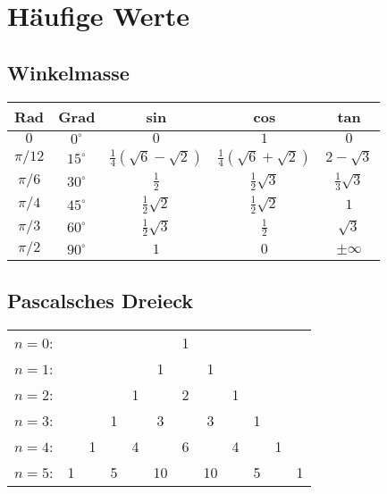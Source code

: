 \section{Häufige Werte}
\subsection{Winkelmasse}
\begin{center}
\begin{tabular}{c|c|c|c|c}
\textbf{Rad}& \textbf{Grad} & \textbf{sin} 						& \textbf{cos} 						& \textbf{tan} \\\hline
$0$ 		& $0^\circ$ 	& $0$ 								& $1$ 								& $0$\\
$\pi/12$ 	& $15^\circ$ 	& $\frac{1}{4}(\sqrt{6}-\sqrt{2})$ 	& $\frac{1}{4}(\sqrt{6}+\sqrt{2})$ 	& $2 - \sqrt{3}$\\
$\pi/6$ 	& $30^\circ$ 	& $\frac{1}{2}$ 					& $\frac{1}{2}\sqrt{3}$ 			& $\frac{1}{3}\sqrt{3}$\\
$\pi/4$ 	& $45^\circ$ 	& $\frac{1}{2}\sqrt{2}$ 			& $\frac{1}{2}\sqrt{2}$				& $1$\\
$\pi/3$ 	& $60^\circ$ 	& $\frac{1}{2}\sqrt{3}$ 			& $\frac{1}{2}$						& $\sqrt{3}$\\
$\pi/2$ 	& $90^\circ$ 	& $1$ 								& $0$ 								& $\pm \infty$\\
\end{tabular}
\end{center}

\subsection{Pascalsches Dreieck}
\begin{tabular}{rccccccccccc} 
$n=0$:& & & & & & 1\\%
$n=1$:& & & & & 1 & & 1\\%
$n=2$:& & & & 1 & & 2 & & 1\\%
$n=3$:& & & 1 & & 3 & & 3 & & 1\\%
$n=4$:& & 1 & & 4 & & 6 & & 4 & & 1\\%
$n=5$:& 1 & & 5 & & 10 & & 10 & & 5 & & 1\\
\end{tabular}
